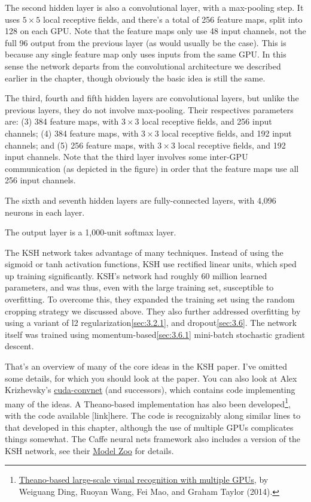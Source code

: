 \documentclass[a4paper,twoside,10pt]{book}
\begin{document}
The second hidden layer is also a convolutional layer, with a max-pooling step. It uses $5\times5$ local receptive fields, and there's a total of 256 feature maps, split into 128 on each GPU. Note that the feature maps only use 48 input channels, not the full 96 output from the previous layer (as would usually be the case). This is because any single feature map only uses inputs from the same GPU. In this sense the network departs from the convolutional architecture we described earlier in the chapter, though obviously the basic idea is still the same.

The third, fourth and fifth hidden layers are convolutional layers, but unlike the previous layers, they do not involve max-pooling. Their respectives parameters are: (3) 384 feature maps, with $3\times3$ local receptive fields, and 256 input channels; (4) 384 feature maps, with $3\times3$ local receptive fields, and 192 input channels; and (5) 256 feature maps, with $3\times3$ local receptive fields, and 192 input channels. Note that the third layer involves some inter-GPU communication (as depicted in the figure) in order that the feature maps use all 256 input channels.

The sixth and seventh hidden layers are fully-connected layers, with 4,096 neurons in each layer.

The output layer is a 1,000-unit softmax layer.

The KSH network takes advantage of many techniques. Instead of using the sigmoid or tanh activation functions, KSH use rectified linear units, which sped up training significantly. KSH's network had roughly 60 million learned parameters, and was thus, even with the large training set, susceptible to overfitting. To overcome this, they expanded the training set using the random cropping strategy we discussed above. They also further addressed overfitting by using a variant of l2 regularization\ref{sec:3.2.1}, and dropout\ref{sec:3.6}. The network itself was trained using momentum-based\ref{sec:3.6.1} mini-batch stochastic gradient descent.

That's an overview of many of the core ideas in the KSH paper. I've omitted some details, for which you should look at the paper. You can also look at Alex Krizhevsky's \href{https://code.google.com/p/cuda-convnet/}{cuda-convnet} (and successors), which contains code implementing many of the ideas. A Theano-based implementation has also been developed\footnote{\href{http://arxiv.org/abs/1412.2302}{Theano-based large-scale visual recognition with multiple GPUs}, by Weiguang Ding, Ruoyan Wang, Fei Mao, and Graham Taylor (2014).}, with the code available [link]here. The code is recognizably along similar lines to that developed in this chapter, although the use of multiple GPUs complicates things somewhat. The Caffe neural nets framework also includes a version of the KSH network, see their \href{http://caffe.berkeleyvision.org/model_zoo.html}{Model Zoo} for details.
\end{document}
